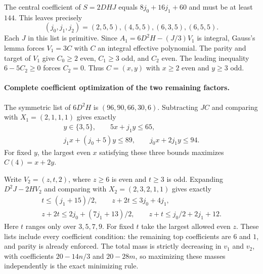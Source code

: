 The central coefficient of $S=2DHJ$ equals
$8j_0+16j_1+60$ and must be at least $144$.
This leaves precisely
\[
 (j_0,j_1,j_2)=(2,5,5),(4,5,5),(6,3,5),(6,5,5).
 \tag{G028.8}
\]
Each $J$ in this list is primitive. Since
$A_1=6D^2H-(J/3)V_1$ is integral, Gauss's lemma
forces $V_1=3C$ with $C$ an integral effective
polynomial. The parity and target of $V_1$ give
$C_0\ge2$ even, $C_1\ge3$ odd, and $C_2$ even.
The leading inequality $6-5C_2\ge0$ forces
$C_2=0$. Thus $C=(x,y)$ with $x\ge2$ even and
$y\ge3$ odd.

\paragraph{Complete coefficient optimization of the two remaining factors.}
The symmetric list of $6D^2H$ is
$(96,90,66,30,6)$. Subtracting $JC$ and comparing
with $X_1=(2,1,1,1)$ gives exactly
\[
 \begin{gathered}
 y\in\{3,5\},\qquad
 5x+j_1y\le65,\\
 j_1x+(j_0+5)y\le89,\qquad
 j_0x+2j_1y\le94.                                  \end{gathered}\tag{G028.9}
\]
For fixed $y$, the largest even $x$ satisfying these
three bounds maximizes $C(4)=x+2y$.

Write $V_2=(z,t,2)$, where $z\ge6$ is even and
$t\ge3$ is odd. Expanding $D^2J-2HV_2$ and comparing
with $X_2=(2,3,2,1,1)$ gives exactly
\[
 \begin{gathered}
 t\le(j_1+15)/2,\qquad
 z+2t\le3j_0+4j_1,\\
 z+2t\le2j_0+(7j_1+13)/2,\qquad
 z+t\le j_0/2+2j_1+12.                             \end{gathered}\tag{G028.10}
\]
Here $t$ ranges only over $3,5,7,9$. For fixed $t$
take the largest allowed even $z$. These lists
include every coefficient condition: the remaining
top coefficients are $6$ and $1$, and parity is
already enforced. The total mass is strictly decreasing
in $v_1$ and $v_2$, with coefficients
$20-14n/3$ and $20-28m$, so maximizing these masses
independently is the exact minimizing rule.

